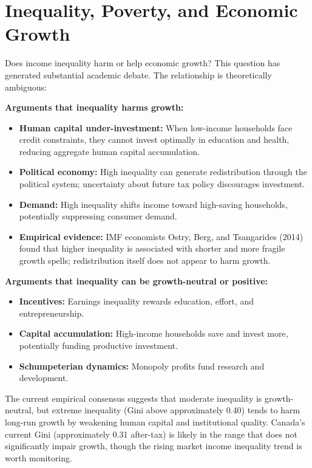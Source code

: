 \section{Inequality, Poverty, and Economic Growth}

Does income inequality harm or help economic growth? This question has generated substantial academic debate. The relationship is theoretically ambiguous:

\textbf{Arguments that inequality harms growth:}
\begin{itemize}
  \item \textbf{Human capital under-investment:} When low-income households face credit constraints, they cannot invest optimally in education and health, reducing aggregate human capital accumulation.
  \item \textbf{Political economy:} High inequality can generate redistribution through the political system; uncertainty about future tax policy discourages investment.
  \item \textbf{Demand:} High inequality shifts income toward high-saving households, potentially suppressing consumer demand.
  \item \textbf{Empirical evidence:} IMF economists Ostry, Berg, and Tsangarides (2014) found that higher inequality is associated with shorter and more fragile growth spells; redistribution itself does not appear to harm growth.
\end{itemize}

\textbf{Arguments that inequality can be growth-neutral or positive:}
\begin{itemize}
  \item \textbf{Incentives:} Earnings inequality rewards education, effort, and entrepreneurship.
  \item \textbf{Capital accumulation:} High-income households save and invest more, potentially funding productive investment.
  \item \textbf{Schumpeterian dynamics:} Monopoly profits fund research and development.
\end{itemize}

The current empirical consensus suggests that moderate inequality is growth-neutral, but extreme inequality (Gini above approximately 0.40) tends to harm long-run growth by weakening human capital and institutional quality. Canada's current Gini (approximately 0.31 after-tax) is likely in the range that does not significantly impair growth, though the rising market income inequality trend is worth monitoring.

